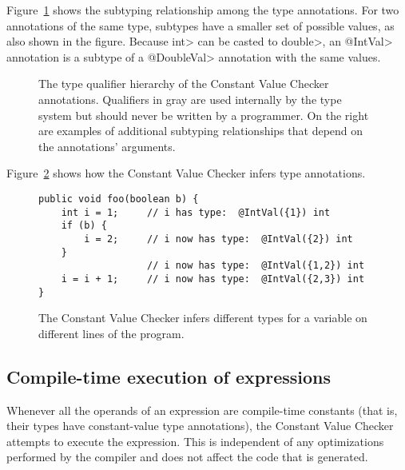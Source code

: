 
Figure~\ref{fig-value-hierarchy} shows the 
subtyping relationship among the type annotations.
For two annotations of the same type, subtypes have a smaller set of
possible values, as also shown in the figure.
Because \<int> can be casted to \<double>, an \<@IntVal> annotation is a
subtype of a \<@DoubleVal> annotation with the same values.

\begin{figure}
\begin{center}
\qquad\qquad
{}
\end{center}
\caption{The type qualifier hierarchy of the Constant Value Checker
annotations. Qualifiers in gray are used
internally by the type system but should never be written by a
programmer.  On the right are examples of additional subtyping
relationships that depend on the annotations' arguments.}
\label{fig-value-hierarchy}
\end{figure}

Figure~\ref{fig-value-multivalue} shows how the Constant Value Checker
infers type annotations.

\begin{figure}
\begin{Verbatim}
public void foo(boolean b) {
    int i = 1;     // i has type:  @IntVal({1}) int
    if (b) {  
        i = 2;     // i now has type:  @IntVal({2}) int
    }        
                   // i now has type:  @IntVal({1,2}) int
    i = i + 1;     // i now has type:  @IntVal({2,3}) int
}
\end{Verbatim}
\caption{The Constant Value Checker infers different types
  for a variable on different lines of the program.}
\label{fig-value-multivalue}
\end{figure}


\subsection{Compile-time execution of expressions\label{staticallyexecutable-annotation}}

Whenever all the operands of an expression are compile-time constants (that
is, their types have constant-value type annotations), the Constant Value
Checker attempts to execute the expression.  This is independent of any
optimizations performed by the compiler and does not affect the code that
is generated.

